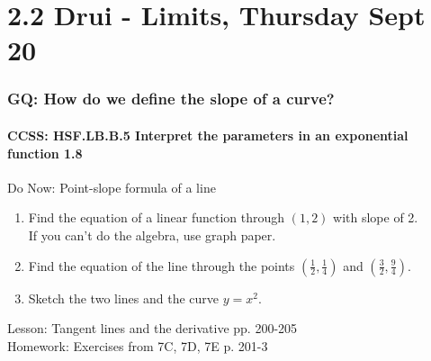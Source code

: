 \documentclass{beamer}
\begin{document}
  \section{2.2 Drui - Limits, Thursday Sept 20}
    \frame
    {
      \frametitle{GQ: How do we define the slope of a curve?}
      \framesubtitle{CCSS: HSF.LB.B.5 Interpret the parameters in an exponential function  \alert{1.8}}

      \begin{block}{Do Now: Point-slope formula of a line}
        \begin{enumerate}
        \item Find the equation of a linear function through $(1,2)$ with slope of 2.\\
        If you can't do the algebra, use graph paper.
        \item Find the equation of the line through the points $\displaystyle (\frac{1}{2}, \frac{1}{4})$ and $\displaystyle (\frac{3}{2}, \frac{9}{4})$.
        \item Sketch the two lines and the curve $y=x^2$.
        \end{enumerate}
     \end{block}
      Lesson: Tangent lines and the derivative pp. 200-205\\ \bigskip
      Homework: Exercises from 7C, 7D, 7E p. 201-3
    }
  
\end{document}
